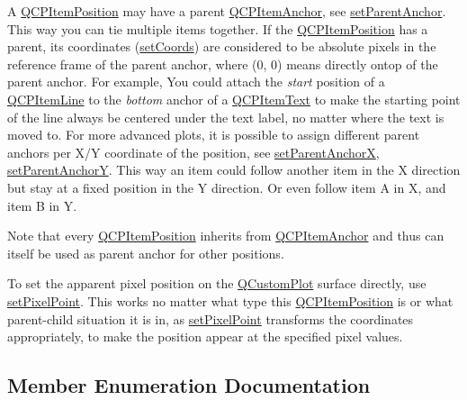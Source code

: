 A \hyperlink{classQCPItemPosition}{Q\+C\+P\+Item\+Position} may have a parent \hyperlink{classQCPItemAnchor}{Q\+C\+P\+Item\+Anchor}, see \hyperlink{classQCPItemPosition_ac094d67a95d2dceafa0d50b9db3a7e51}{set\+Parent\+Anchor}. This way you can tie multiple items together. If the \hyperlink{classQCPItemPosition}{Q\+C\+P\+Item\+Position} has a parent, its coordinates (\hyperlink{classQCPItemPosition_aa988ba4e87ab684c9021017dcaba945f}{set\+Coords}) are considered to be absolute pixels in the reference frame of the parent anchor, where (0, 0) means directly ontop of the parent anchor. For example, You could attach the {\itshape start} position of a \hyperlink{classQCPItemLine}{Q\+C\+P\+Item\+Line} to the {\itshape bottom} anchor of a \hyperlink{classQCPItemText}{Q\+C\+P\+Item\+Text} to make the starting point of the line always be centered under the text label, no matter where the text is moved to. For more advanced plots, it is possible to assign different parent anchors per X/Y coordinate of the position, see \hyperlink{classQCPItemPosition_add71461a973927c74e42179480916d9c}{set\+Parent\+AnchorX}, \hyperlink{classQCPItemPosition_add5ec1db9d19cec58a3b5c9e0a0c3f9d}{set\+Parent\+AnchorY}. This way an item could follow another item in the X direction but stay at a fixed position in the Y direction. Or even follow item A in X, and item B in Y.

Note that every \hyperlink{classQCPItemPosition}{Q\+C\+P\+Item\+Position} inherits from \hyperlink{classQCPItemAnchor}{Q\+C\+P\+Item\+Anchor} and thus can itself be used as parent anchor for other positions.

To set the apparent pixel position on the \hyperlink{classQCustomPlot}{Q\+Custom\+Plot} surface directly, use \hyperlink{classQCPItemPosition_ab404e56d9ac2ac2df0382c57933a71ef}{set\+Pixel\+Point}. This works no matter what type this \hyperlink{classQCPItemPosition}{Q\+C\+P\+Item\+Position} is or what parent-\/child situation it is in, as \hyperlink{classQCPItemPosition_ab404e56d9ac2ac2df0382c57933a71ef}{set\+Pixel\+Point} transforms the coordinates appropriately, to make the position appear at the specified pixel values. 

\subsection{Member Enumeration Documentation}
